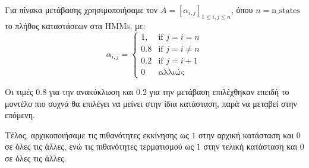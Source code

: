 

\noindent Για πίνακα μετάβασης χρησιμοποιήσαμε τον $A = [α_{i, j}]_{1 \le i, j \le n}$, όπου $n = \text{n\_states}$ το πλήθος καταστάσεων στα HMMs, με:
$$α_{i, j} = 
\begin{cases}
	1, & \text{if $j = i = n$}\\
	0.8 & \text{if $j = i \neq n$}\\
	0.2 & \text{if $j = i+1$}\\
	0 & \text{αλλιώς}
\end{cases}
$$

\noindent Οι τιμές 0.8 για την ανακύκλωση και 0.2 για την μετάβαση επιλέχθηκαν επειδή το μοντέλο πιο συχνά θα επιλέγει να μείνει στην ίδια κατάσταση, παρά να μεταβεί στην επόμενη.



\noindent Τέλος, αρχικοποιήσαμε τις πιθανότητες εκκίνησης ως $1$ στην αρχική κατάσταση και $0$ σε όλες τις άλλες, ενώ τις πιθανότητες τερματισμού ως $1$ στην τελική κατάσταση και $0$ σε όλες τις άλλες.


